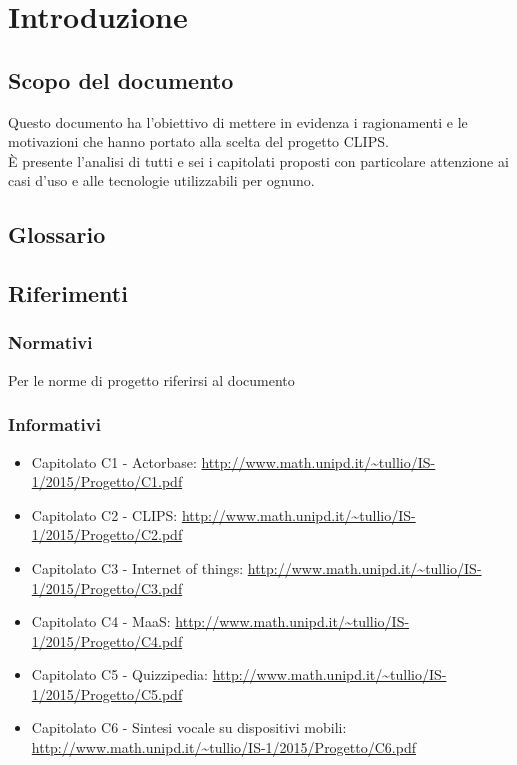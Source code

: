 \section{Introduzione}
\subsection{Scopo del documento}

Questo documento ha l'obiettivo di mettere in evidenza i ragionamenti e le motivazioni che hanno portato alla scelta del progetto CLIPS.\\
È presente l'analisi di tutti e sei i capitolati proposti con particolare attenzione ai casi d'uso e alle tecnologie utilizzabili per ognuno.

\subsection{Glossario}
\GLOSSARIO

\subsection{Riferimenti}
\subsubsection{Normativi}
Per le norme di progetto riferirsi al documento \NPdoc
\subsubsection{Informativi}
\begin{itemize}
	\item Capitolato C1 - Actorbase: \url{http://www.math.unipd.it/~tullio/IS-1/2015/Progetto/C1.pdf}
	\item Capitolato C2 - CLIPS: \url{http://www.math.unipd.it/~tullio/IS-1/2015/Progetto/C2.pdf}
	\item Capitolato C3 - Internet of things: \url{http://www.math.unipd.it/~tullio/IS-1/2015/Progetto/C3.pdf}
	\item Capitolato C4 - MaaS: \url{http://www.math.unipd.it/~tullio/IS-1/2015/Progetto/C4.pdf}
	\item Capitolato C5 - Quizzipedia: \url{http://www.math.unipd.it/~tullio/IS-1/2015/Progetto/C5.pdf}
	\item Capitolato C6 - Sintesi vocale su dispositivi mobili: \url{http://www.math.unipd.it/~tullio/IS-1/2015/Progetto/C6.pdf}
\end{itemize}